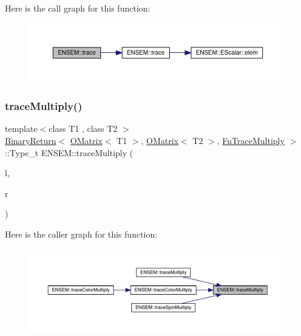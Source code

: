 Here is the call graph for this function\+:\nopagebreak
\begin{figure}[H]
\begin{center}
\leavevmode
\includegraphics[width=350pt]{d8/d55/group__obsmatrix_gaff7b73c5978746f6706e0cd02f55cc40_cgraph}
\end{center}
\end{figure}
\mbox{\label{group__obsmatrix_ga60f2f16fd8f3e889214584d3c0a90e92}} 
\subsubsection{\texorpdfstring{traceMultiply()}{traceMultiply()}\hspace{0.1cm}{\footnotesize\ttfamily [1/3]}}
{\footnotesize\ttfamily template$<$class T1 , class T2 $>$ \\
\mbox{\hyperlink{structENSEM_1_1BinaryReturn}{Binary\+Return}}$<$ \mbox{\hyperlink{classENSEM_1_1OMatrix}{O\+Matrix}}$<$ T1 $>$, \mbox{\hyperlink{classENSEM_1_1OMatrix}{O\+Matrix}}$<$ T2 $>$, \mbox{\hyperlink{structENSEM_1_1FnTraceMultiply}{Fn\+Trace\+Multiply}} $>$\+::Type\+\_\+t E\+N\+S\+E\+M\+::trace\+Multiply (\begin{DoxyParamCaption}\item[{const \mbox{\hyperlink{classENSEM_1_1OMatrix}{O\+Matrix}}$<$ T1 $>$ \&}]{l,  }\item[{const \mbox{\hyperlink{classENSEM_1_1OMatrix}{O\+Matrix}}$<$ T2 $>$ \&}]{r }\end{DoxyParamCaption})\hspace{0.3cm}{\ttfamily [inline]}}

Here is the caller graph for this function\+:\nopagebreak
\begin{figure}[H]
\begin{center}
\leavevmode
\includegraphics[width=350pt]{d8/d55/group__obsmatrix_ga60f2f16fd8f3e889214584d3c0a90e92_icgraph}
\end{center}
\end{figure}
\mbox{\label{group__obsmatrix_ga465cbe792dfb205b829f653853253e8f}} 
